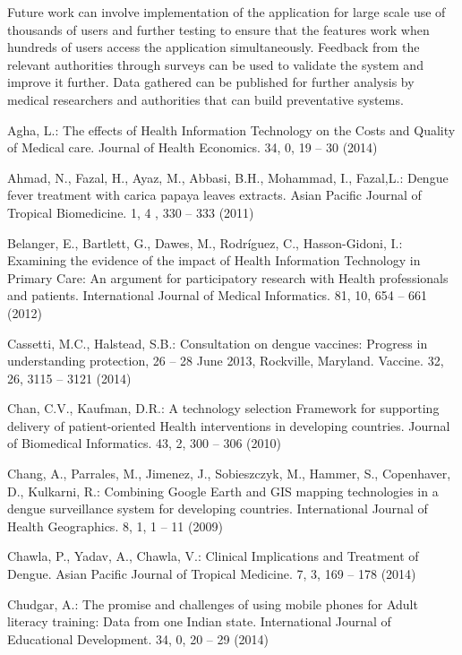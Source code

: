 \documentclass[runningheads,a4paper]{llncs}
\begin{document}
Future work can involve  implementation of the application for large scale use of thousands of users and further testing to ensure that the features work when hundreds of users access the application simultaneously. Feedback from the relevant authorities through surveys can be used to  validate the system and improve it further. Data gathered can be published for further analysis by medical researchers and authorities that can build preventative systems. 
 


\begin{thebibliography}{4}

 Agha, L.: The effects of Health Information Technology on the Costs and Quality
  of Medical care. Journal of Health Economics. 34, 0, 19 -- 30 (2014)

 Ahmad, N., Fazal, H., Ayaz, M., Abbasi, B.H., Mohammad, I., Fazal,L.:
Dengue fever treatment with carica papaya leaves extracts. Asian Pacific Journal of Tropical Biomedicine. 1, 4 , 330
  -- 333 (2011)

 Belanger, E., Bartlett, G., Dawes, M., Rodríguez, C., Hasson-Gidoni, I.:
Examining the evidence of the impact of Health Information Technology in Primary Care: An argument for participatory research with Health professionals and patients.
International Journal of Medical Informatics. 81, 10, 654 -- 661 (2012)

 Cassetti, M.C., Halstead, S.B.: Consultation on dengue vaccines: Progress in understanding protection, 
26 -- 28 June 2013, Rockville, Maryland. Vaccine. 32, 26, 3115 -- 3121 (2014)

 Chan, C.V., Kaufman, D.R.:
A technology selection Framework for supporting delivery of patient-oriented Health interventions in developing countries.
Journal of Biomedical Informatics. 43, 2, 300 -- 306 (2010) 

 Chang, A., Parrales, M., Jimenez, J., Sobieszczyk, M., Hammer, S., Copenhaver, D., Kulkarni, R.:
Combining Google Earth and GIS mapping technologies in a dengue surveillance system for developing countries.
International Journal of Health Geographics. 8, 1, 1 -- 11 (2009)

 Chawla, P., Yadav, A., Chawla, V.: Clinical Implications and Treatment of Dengue.
Asian Pacific Journal of Tropical Medicine. 7, 3, 169 -- 178 (2014)

 Chudgar, A.:
The promise and challenges of using mobile phones for Adult literacy training: Data from one Indian state.
International Journal of Educational Development. 34, 0, 20 -- 29 (2014)


\end{thebibliography}
\end{document}
